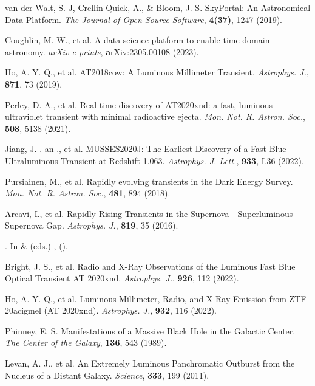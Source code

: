 \documentclass{nature_plusfigure}
\newcommand{\mn}{{Mon. Not. R. Astron. Soc.}}
\newcommand{\mnras}{\mn}
\newcommand{\apj}{{Astrophys. J.}}
\newcommand{\apjl}{{Astrophys. J. Lett.}}
\begin{document}
\begin{methods}
\begin{thebibliography}{10}
 van der Walt, S. J, Crellin-Quick, A., \& Bloom, J. S. SkyPortal: An Astronomical Data Platform. \emph{The Journal of Open Source Software}, \textbf{4(37)}, 1247 (2019). 

 Coughlin, M. W., et al. A data science platform to enable time-domain astronomy. \emph{arXiv e-prints}, \textbf arXiv:2305.00108 (2023). 


 Ho, A. Y. Q., et al. AT2018cow: A Luminous Millimeter Transient. \emph{\apj}, \textbf{871}, 73 (2019). 

 Perley, D. A., et al. Real-time discovery of AT2020xnd: a fast, luminous ultraviolet transient with minimal radioactive ejecta. \emph{\mnras}, \textbf{508}, 5138 (2021). 

 Jiang, J.-. an ., et al. MUSSES2020J: The Earliest Discovery of a Fast Blue Ultraluminous Transient at Redshift 1.063. \emph{\apjl}, \textbf{933}, L36 (2022). 

 Pursiainen, M., et al. Rapidly evolving transients in the Dark Energy Survey. \emph{\mnras}, \textbf{481}, 894 (2018). 

 Arcavi, I., et al. Rapidly Rising Transients in the Supernova—Superluminous Supernova Gap. \emph{\apj}, \textbf{819}, 35 (2016). 

\newblock {}.
\newblock In  \&  (eds.) \emph{},
   ().

 Bright, J. S., et al. Radio and X-Ray Observations of the Luminous Fast Blue Optical Transient AT 2020xnd. \emph{\apj}, \textbf{926}, 112 (2022). 

 Ho, A. Y. Q., et al. Luminous Millimeter, Radio, and X-Ray Emission from ZTF 20acigmel (AT 2020xnd). \emph{\apj}, \textbf{932}, 116 (2022). 

 Phinney, E. S. Manifestations of a Massive Black Hole in the Galactic Center. \emph{The Center of the Galaxy}, \textbf{136}, 543 (1989). 

  Levan, A. J., et al. An Extremely Luminous Panchromatic Outburst from the Nucleus of a Distant Galaxy. \emph{Science}, \textbf{333}, 199 (2011). 


\end{thebibliography}
\end{methods}
\end{document}
